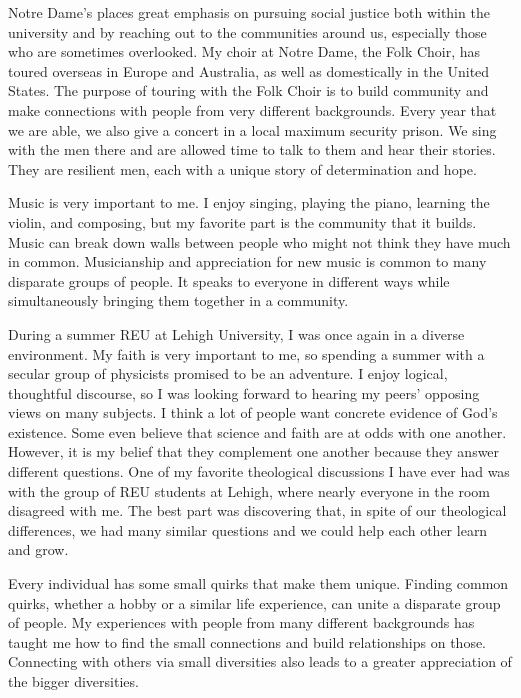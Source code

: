 {    Notre Dame's places great emphasis on pursuing social justice both within the
    university and by reaching out to the communities around us, especially
    those who are sometimes overlooked. My choir at Notre Dame, the Folk Choir,
    has toured overseas in Europe and Australia, as well as domestically in the
    United States. The purpose of touring with the Folk Choir is to build
    community and make connections with people from very different backgrounds.
    Every year that we are able, we also give a concert in a local maximum
    security prison. We sing with the men there and are allowed time to talk to
    them and hear their stories. They are resilient men, each with a unique
    story of determination and hope.

    Music is very important to me. I enjoy singing, playing the piano, learning
    the violin, and composing, but my favorite part is the community that it
    builds. Music can break down walls between people who might not think they
    have much in common. Musicianship and appreciation for new music is common
    to many disparate groups of people. It speaks to everyone in different ways
    while simultaneously bringing them together in a community.

    During a summer REU at Lehigh University, I was once again in a 
    diverse environment. My faith is very important to me, so spending a summer
    with a secular group of physicists promised to be an adventure. I enjoy
    logical, thoughtful discourse, so I was looking forward to hearing my
    peers' opposing views on many subjects. I think a lot of people want
    concrete evidence of God's existence. Some even believe that science and
    faith are at odds with one another. However, it is my belief that they
    complement one another because they answer different questions. One of my
    favorite theological discussions I have ever had was with the group of REU
    students at Lehigh, where nearly everyone in the room disagreed with me.
    The best part was discovering that, in spite of our theological
    differences, we had many similar questions and we could help each other
    learn and grow.
    
    Every individual has some small quirks that make them unique. Finding
    common quirks, whether a hobby or a similar life experience, can unite a
    disparate group of people. My experiences with people from many different
    backgrounds has taught me how to find the small connections and build
    relationships on those. Connecting with others via small diversities also
    leads to a greater appreciation of the bigger diversities.
}



